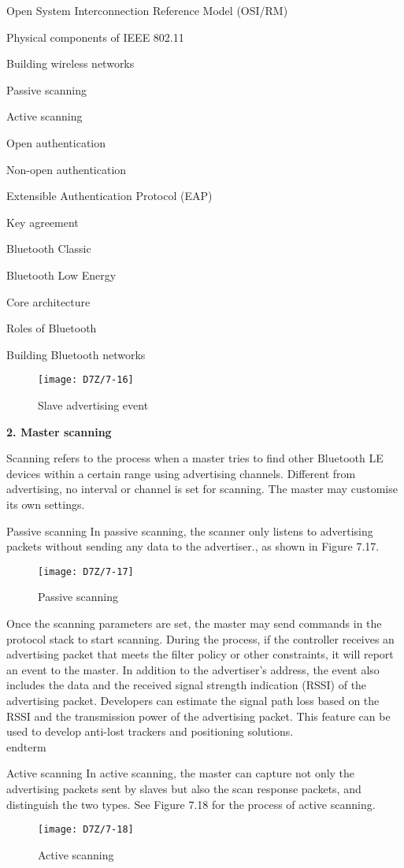\documentclass[a4paper,12pt]{book}
\begin{document}
\begin{term}{Open System Interconnection Reference Model (OSI/RM)}
\begin{term}{Physical components of IEEE 802.11}
\begin{term}{Building wireless networks}
\begin{term}{Passive scanning}
\begin{term}{Active scanning}
\begin{term}{Open authentication}
\begin{term}{Non-open authentication}
\begin{term}{Extensible Authentication Protocol (EAP)}
\begin{term}{Key agreement}
\begin{term}{Bluetooth Classic}
\begin{term}{Bluetooth Low Energy}
\begin{term}{Core architecture}
\begin{term}{Roles of Bluetooth}
\begin{term}{Building Bluetooth networks}
\begin{figure}[!h]
    \centering
    \texttt{[image: D7Z/7-16]}
    \caption{Slave advertising event}
\end{figure}

\textbf{2. Master scanning}

Scanning refers to the process when a master tries to find other Bluetooth LE devices within a certain range using advertising channels. Different from advertising, no interval or channel is set for scanning. The master may customise its own settings.

\begin{term}{Passive scanning}
    In passive scanning, the scanner only listens to advertising packets without sending any data to the advertiser., as shown in Figure 7.17.

    \begin{figure}[!h]
        \centering
        \texttt{[image: D7Z/7-17]}
        \caption{Passive scanning}
    \end{figure}

    \vspace{6pt}
    Once the scanning parameters are set, the master may send commands in the protocol stack to start scanning. During the process, if the controller receives an advertising packet that meets the filter policy or other constraints, it will report an event to the master. In addition to the advertiser’s address, the event also includes the data and the received signal strength indication (RSSI) of the advertising packet. Developers can estimate the signal path loss based on the RSSI and the transmission power of the advertising packet. This feature can be used to develop anti-lost trackers and positioning solutions.
\\end{term}{}

\begin{term}{Active scanning}
     In active scanning, the master can capture not only the advertising packets sent by slaves but also the scan response packets, and distinguish the two types. See Figure 7.18 for the process of active scanning.

    \begin{figure}[!h]
        \centering
        \texttt{[image: D7Z/7-18]}
        \caption{Active scanning}
    \end{figure}


\end{term}
\end{term}
\end{term}
\end{term}
\end{term}
\end{term}
\end{term}
\end{term}
\end{term}
\end{term}
\end{term}
\end{term}
\end{term}
\end{term}
\end{term}
\end{term}
\end{document}
